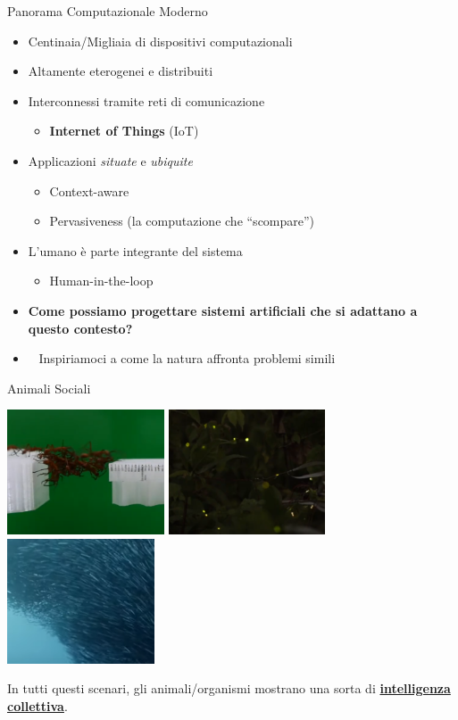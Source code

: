 \documentclass[presentation, 10pt,aspectratio=169]{beamer}\mode<presentation>{\usetheme{AMSBolognaFC}}
\begin{document}
\begin{frame}{Panorama Computazionale Moderno}
	\begin{itemize}
		\item Centinaia/Migliaia di dispositivi computazionali
		\item Altamente eterogenei e distribuiti
		\item Interconnessi tramite reti di comunicazione
		\begin{itemize}
			\item \textbf{Internet of Things} (IoT)
		\end{itemize}
		\item Applicazioni \alert{\emph{situate}} e \alert{\emph{ubiquite}}
		\begin{itemize}
			\item Context-aware
			\item Pervasiveness (la computazione che ``scompare'')
		\end{itemize}
		\item L'umano è parte integrante del sistema
		\begin{itemize}
			\item Human-in-the-loop
		\end{itemize}
		\item \alert{\textbf{Come possiamo progettare sistemi artificiali che si adattano a questo contesto?}}
		\item \alert{\faLeaf} ~ Inspiriamoci a come la natura affronta problemi simili ~ \alert{\faLeaf}
	\end{itemize}
\end{frame}
\begin{frame}[fragile]{Animali Sociali}
\begin{center}
\includegraphics[height=3.7cm]{img/example.png}
\includegraphics[height=3.7cm]{img/fireflies.png}
\includegraphics[height=3.7cm]{img/school.png}
\end{center}
In tutti questi scenari, gli animali/organismi mostrano una sorta di \underline{\alert{\textbf{intelligenza collettiva}}}.
\end{frame}
\end{document}
